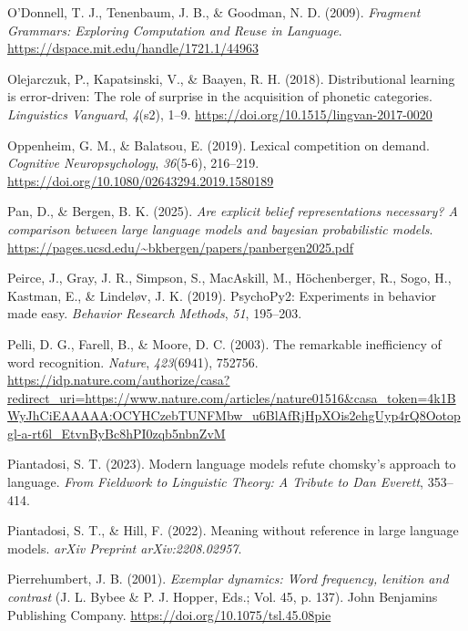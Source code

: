 \documentclass[
  12pt,
  letterpaper,
]{scrreport}
\newlength{\cslhangindent}
\newenvironment{CSLReferences}[2] %
 {\begin{list}{}{%
  \setlength{\itemindent}{0pt}
  \setlength{\leftmargin}{0pt}
  \setlength{\parsep}{0pt}
  \ifodd #1
   \setlength{\leftmargin}{\cslhangindent}
   \setlength{\itemindent}{-1\cslhangindent}
  \fi
  \setlength{\itemsep}{#2\baselineskip}}}
 {\end{list}}
\begin{document}
\begin{CSLReferences}{1}{0}
O'Donnell, T. J., Tenenbaum, J. B., \& Goodman, N. D. (2009).
\emph{Fragment Grammars: Exploring Computation and Reuse in Language}.
\url{https://dspace.mit.edu/handle/1721.1/44963}

Olejarczuk, P., Kapatsinski, V., \& Baayen, R. H. (2018). Distributional
learning is error-driven: The role of surprise in the acquisition of
phonetic categories. \emph{Linguistics Vanguard}, \emph{4}(s2), 1--9.
\url{https://doi.org/10.1515/lingvan-2017-0020}

Oppenheim, G. M., \& Balatsou, E. (2019). Lexical competition on demand.
\emph{Cognitive Neuropsychology}, \emph{36}(5-6), 216--219.
\url{https://doi.org/10.1080/02643294.2019.1580189}

Pan, D., \& Bergen, B. K. (2025). \emph{Are explicit belief
representations necessary? A comparison between large language models
and bayesian probabilistic models}.
\url{https://pages.ucsd.edu/~bkbergen/papers/panbergen2025.pdf}

Peirce, J., Gray, J. R., Simpson, S., MacAskill, M., Höchenberger, R.,
Sogo, H., Kastman, E., \& Lindeløv, J. K. (2019). PsychoPy2: Experiments
in behavior made easy. \emph{Behavior Research Methods}, \emph{51},
195--203.

Pelli, D. G., Farell, B., \& Moore, D. C. (2003). The remarkable
inefficiency of word recognition. \emph{Nature}, \emph{423}(6941),
752756.
\url{https://idp.nature.com/authorize/casa?redirect_uri=https://www.nature.com/articles/nature01516&casa_token=4k1BWyJhCiEAAAAA:OCYHCzebTUNFMbw_u6BlAfRjHpXOis2ehgUyp4rQ8Ootopgl-a-rt6l_EtvnByBc8hPI0zqb5nbnZvM}

Piantadosi, S. T. (2023). Modern language models refute chomsky's
approach to language. \emph{From Fieldwork to Linguistic Theory: A
Tribute to Dan Everett}, 353--414.

Piantadosi, S. T., \& Hill, F. (2022). Meaning without reference in
large language models. \emph{arXiv Preprint arXiv:2208.02957}.

Pierrehumbert, J. B. (2001). \emph{Exemplar dynamics: Word frequency,
lenition and contrast} (J. L. Bybee \& P. J. Hopper, Eds.; Vol. 45, p.
137). John Benjamins Publishing Company.
\url{https://doi.org/10.1075/tsl.45.08pie}


\end{CSLReferences}
\end{document}
